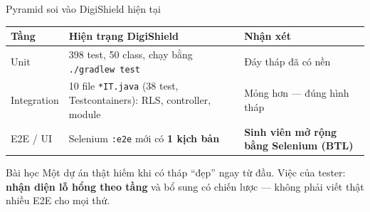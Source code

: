 \documentclass[aspectratio=169,12pt]{beamer}
\begin{document}
\begin{frame}{Pyramid soi vào DigiShield hiện tại}
  \begin{center}
  \small
  \begin{tabular}{p{2.4cm}p{5.2cm}p{4.2cm}}
    \toprule
    \textbf{Tầng} & \textbf{Hiện trạng DigiShield} & \textbf{Nhận xét} \\
    \midrule
    Unit & 398 test, 50 class, chạy bằng \texttt{./gradlew test} & Đáy tháp đã có nền \\
    Integration & 10 file \texttt{*IT.java} (38 test, Testcontainers): RLS, controller, module & Mỏng hơn --- đúng hình tháp \\
    E2E / UI & Selenium \texttt{:e2e} mới có \textbf{1 kịch bản} & \textbf{Sinh viên mở rộng bằng Selenium (BTL)} \\
    \bottomrule
  \end{tabular}
  \end{center}

  \vspace{0.4em}
  \begin{block}{Bài học}
    Một dự án thật hiếm khi có tháp ``đẹp'' ngay từ đầu. Việc của tester:
    \textbf{nhận diện lỗ hổng theo tầng} và bổ sung có chiến lược --- không phải
    viết thật nhiều E2E cho mọi thứ.
  \end{block}
\end{frame}
\end{document}
